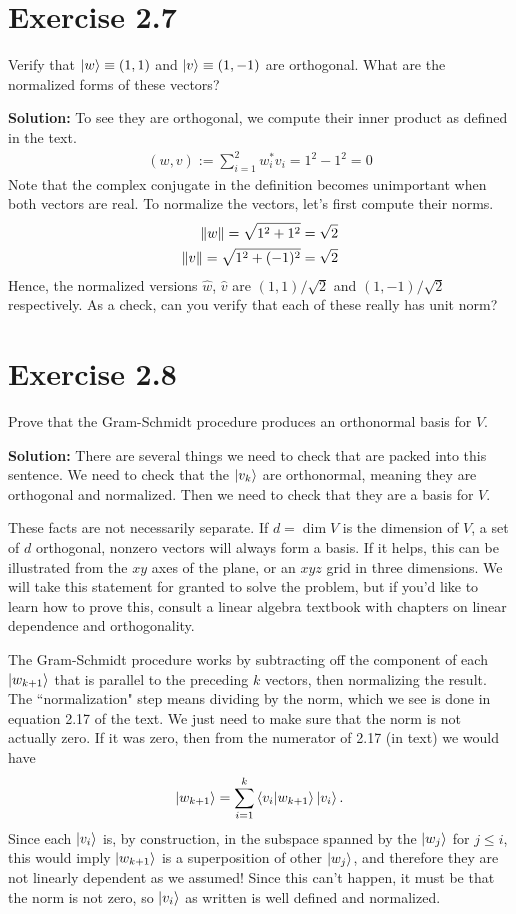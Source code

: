 \documentclass{book}
\begin{document}
\section*{Exercise 2.7}
    Verify that $\ket{w} \equiv (1, 1)$ and $\ket{v} \equiv (1, -1)$ are orthogonal. What are the normalized forms of these vectors?
    
    \textbf{Solution:} To see they are orthogonal, we compute their inner product as defined in the text.
    \begin{align}
        (w,v) := \sum_{i=1}^2 w_i^* v_i = 1^2 - 1^2 = 0
    \end{align}
    Note that the complex conjugate in the definition becomes unimportant when both vectors are real. To normalize the vectors, let's first compute their norms.
    \begin{align}
        \norm{w} = \sqrt{1^2 + 1^2} = \sqrt{2} \\
        \norm{v} = \sqrt{1^2 + (-1)^2} = \sqrt{2}
    \end{align}
    Hence, the normalized versions $\hat{w}$, $\hat{v}$ are $(1,1)/\sqrt{2}$ and $(1,-1)/\sqrt{2}$ respectively. As a check, can you verify that each of these really has unit norm?
    
\section*{Exercise 2.8}
    Prove that the Gram-Schmidt procedure produces an orthonormal basis for $V$.
    
    \textbf{Solution:} There are several things we need to check that are packed into this sentence. We need to check that the $\ket{v_k}$ are orthonormal, meaning they are orthogonal and normalized. Then we need to check that they are a basis for $V$. 
    
    These facts are not necessarily separate. If $d=\dim{V}$ is the dimension of $V$, a set of $d$ orthogonal, nonzero vectors will always form a basis. If it helps, this can be illustrated from the $xy$ axes of the plane, or an $xyz$ grid in three dimensions. We will take this statement for granted to solve the problem, but if you'd like to learn how to prove this, consult a linear algebra textbook with chapters on linear dependence and orthogonality.
    
    The Gram-Schmidt procedure works by subtracting off the component of each $\ket{w_{k+1}}$ that is parallel to the preceding $k$ vectors, then normalizing the result. The ``normalization" step means dividing by the norm, which we see is done in equation 2.17 of the text. We just need to make sure that the norm is not actually zero. If it was zero, then from the numerator of 2.17 (in text) we would have
    \begin{align}
        \ket{w_{k+1}} = \sum_{i=1}^k \braket{v_i}{w_{k+1}} \ket{v_i}.
    \end{align}
    Since each $\ket{v_i}$ is, by construction, in the subspace spanned by the $\ket{w_j}$ for $j \leq i$, this would imply $\ket{w_{k+1}}$ is a superposition of other $\ket{w_j}$, and therefore they are not linearly dependent as we assumed! Since this can't happen, it must be that the norm is not zero, so $\ket{v_i}$ as written is well defined and normalized. 
    
\end{document}
